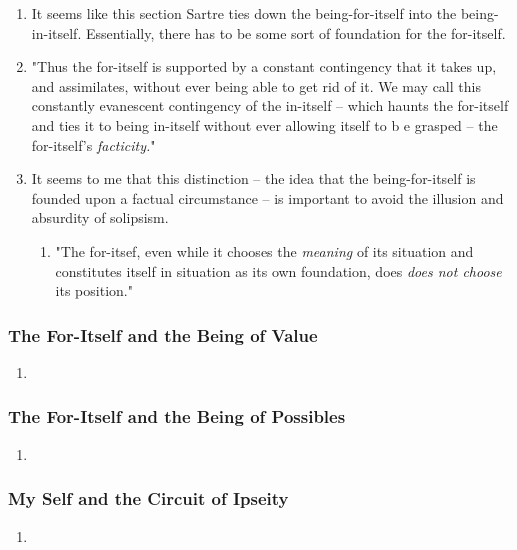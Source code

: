 \begin{enumerate}
  \item It seems like this section Sartre ties down the being-for-itself into the being-in-itself. Essentially, there has to be some sort of foundation for the for-itself.
  \item "Thus the for-itself is supported by a constant contingency that it takes up, and assimilates, without ever being able to get rid of it. We may call this constantly evanescent contingency of the in-itself -- which haunts the for-itself and ties it to being in-itself without ever allowing itself to b e grasped -- the for-itself's \emph{facticity.}" \autocite[133]{sartre}
  \item It seems to me that this distinction -- the idea that the being-for-itself is founded upon a factual circumstance -- is important to avoid the illusion and absurdity of solipsism.
  \begin{enumerate}
    \item "The for-itsef, even while it chooses the \emph{meaning} of its situation and constitutes itself in situation as its own foundation, does \emph{does not choose} its position." \autocite[134]{sartre}
  \end{enumerate}
\end{enumerate}

\subsubsection{The For-Itself and the Being of Value}

\begin{enumerate}
  \item
\end{enumerate}

\subsubsection{The For-Itself and the Being of Possibles}

\begin{enumerate}
  \item
\end{enumerate}

\subsubsection{My Self and the Circuit of Ipseity}

\begin{enumerate}
  \item
\end{enumerate}

